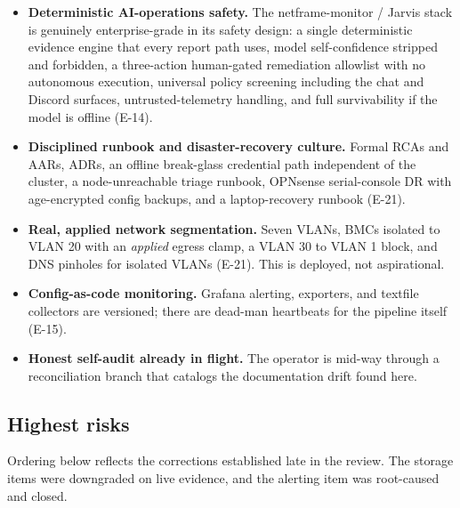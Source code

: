 \begin{itemize}
  \item \textbf{Deterministic AI-operations safety.} The netframe-monitor / Jarvis
  stack is genuinely enterprise-grade in its safety design: a single deterministic
  evidence engine that every report path uses, model self-confidence stripped and
  forbidden, a three-action human-gated remediation allowlist with no autonomous
  execution, universal policy screening including the chat and Discord surfaces,
  untrusted-telemetry handling, and full survivability if the model is offline
  (E-14).
  \item \textbf{Disciplined runbook and disaster-recovery culture.} Formal RCAs and
  AARs, ADRs, an offline break-glass credential path independent of the cluster,
  a node-unreachable triage runbook, OPNsense serial-console DR with age-encrypted
  config backups, and a laptop-recovery runbook (E-21).
  \item \textbf{Real, applied network segmentation.} Seven VLANs, BMCs isolated to
  VLAN 20 with an \emph{applied} egress clamp, a VLAN 30 to VLAN 1 block, and DNS
  pinholes for isolated VLANs (E-21). This is deployed, not aspirational.
  \item \textbf{Config-as-code monitoring.} Grafana alerting, exporters, and
  textfile collectors are versioned; there are dead-man heartbeats for the pipeline
  itself (E-15).
  \item \textbf{Honest self-audit already in flight.} The operator is mid-way
  through a reconciliation branch that catalogs the documentation drift found here.
\end{itemize}

\subsection{Highest risks}

Ordering below reflects the corrections established late in the review. The
storage items were downgraded on live evidence, and the alerting item was
root-caused and closed.

